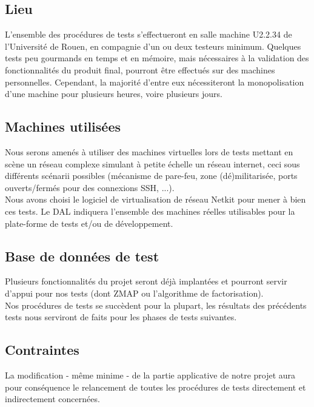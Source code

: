 \documentclass[a4paper,11pt,french]{article}
\begin{document}
\subsection{Lieu}

L'ensemble des procédures de tests s'effectueront en salle machine U2.2.34 de l'Université de Rouen, en compagnie d'un ou deux testeurs minimum. Quelques tests peu gourmands en temps et en mémoire, mais nécessaires à la validation des fonctionnalités du produit final, pourront être effectués sur des machines personnelles.
Cependant, la majorité d'entre eux nécessiteront la monopolisation d'une machine pour plusieurs heures, voire plusieurs jours.

\subsection{Machines utilisées}

Nous serons amenés à utiliser des machines virtuelles lors de tests mettant en scène un réseau complexe simulant à petite échelle un réseau internet, ceci sous différents scénarii possibles (mécanisme de pare-feu, zone (dé)militarisée, ports ouverts/fermés pour des connexions SSH, ...). \\

Nous avons choisi le logiciel de virtualisation de réseau Netkit pour mener à bien ces tests. Le DAL indiquera l'ensemble des machines réelles utilisables pour la plate-forme de tests et/ou de développement.

\subsection{Base de données de test}

Plusieurs fonctionnalités du projet seront déjà implantées et pourront servir d'appui pour nos tests (dont ZMAP ou l'algorithme de factorisation).\\

Nos procédures de tests se succèdent pour la plupart, les résultats des précédents tests nous serviront de faits pour les phases de tests suivantes.

\subsection{Contraintes}

La modification - même minime - de la partie applicative de notre projet aura pour conséquence le relancement de toutes les procédures de tests directement et indirectement concernées.\\
\end{document}
